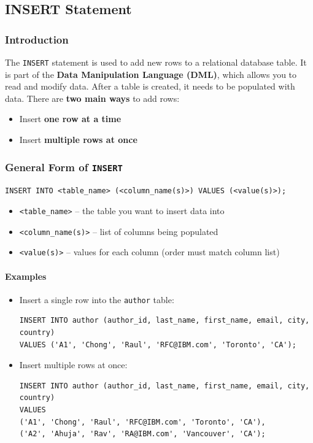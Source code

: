 \documentclass{article}
\begin{document}
\subsection{INSERT Statement}

\subsubsection{Introduction}
The \texttt{INSERT} statement is used to add new rows to a relational database table.  
It is part of the \textbf{Data Manipulation Language (DML)}, which allows you to read and modify data.  
After a table is created, it needs to be populated with data. There are \textbf{two main ways} to add rows:
\begin{itemize}
    \item Insert \textbf{one row at a time}
    \item Insert \textbf{multiple rows at once}
\end{itemize}


\subsubsection{General Form of \texttt{INSERT}}
\begin{FormulaBox}
\texttt{INSERT INTO <table\_name> (<column\_name(s)>) VALUES (<value(s)>); }
\end{FormulaBox}

\begin{itemize}
    \item \texttt{<table\_name>} – the table you want to insert data into  
    \item \texttt{<column\_name(s)>} – list of columns being populated  
    \item \texttt{<value(s)>} – values for each column (order must match column list)  
\end{itemize}
\paragraph{Examples}
\begin{itemize}
    \item Insert a single row into the \texttt{author} table:  
\begin{verbatim}
INSERT INTO author (author_id, last_name, first_name, email, city, country)
VALUES ('A1', 'Chong', 'Raul', 'RFC@IBM.com', 'Toronto', 'CA');
\end{verbatim}

    \item Insert multiple rows at once:  
\begin{verbatim}
INSERT INTO author (author_id, last_name, first_name, email, city, country)
VALUES 
('A1', 'Chong', 'Raul', 'RFC@IBM.com', 'Toronto', 'CA'),
('A2', 'Ahuja', 'Rav', 'RA@IBM.com', 'Vancouver', 'CA');
\end{verbatim}
\end{itemize}
\end{document}
